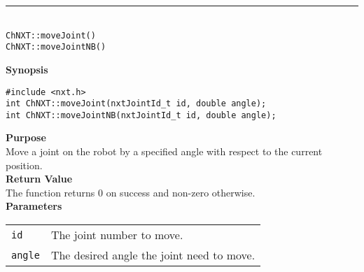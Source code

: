 \noindent
\vspace{5pt}
\rule{4.5in}{0.015in}\\
\noindent
{\LARGE \texttt{ChNXT::moveJoint()} }\\
{\LARGE \texttt{ChNXT::moveJointNB()} }\\


\noindent
{\bf Synopsis}
\vspace{-8pt}
\begin{verbatim}
#include <nxt.h>
int ChNXT::moveJoint(nxtJointId_t id, double angle);
int ChNXT::moveJointNB(nxtJointId_t id, double angle);
\end{verbatim}

\noindent
{\bf Purpose}\\
Move a joint on the robot by a specified angle with respect to the
current position.\\

\noindent
{\bf Return Value}\\
The function returns 0 on success and non-zero otherwise.\\

\noindent
{\bf Parameters}\\
\vspace{-0.1in}
\begin{description}
\item               
\begin{tabular}{p{20 mm}p{135 mm}}
\texttt{id} & The joint number to move. \\
\texttt{angle} & The desired angle the joint need to move. \\
\end{tabular}
\end{description}

